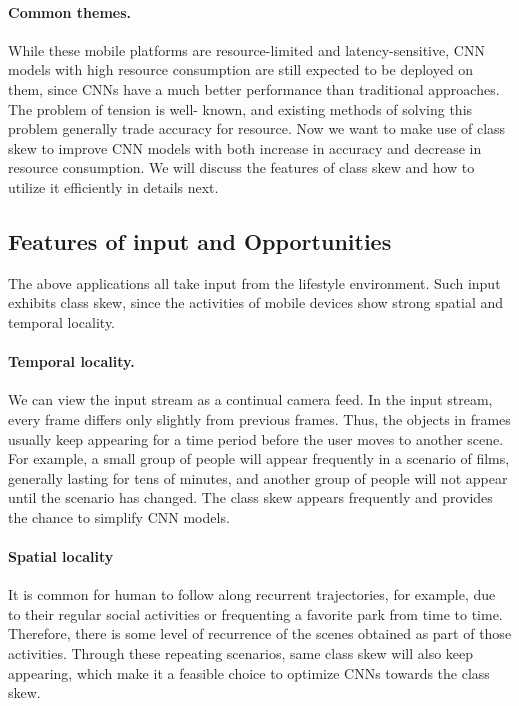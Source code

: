 \documentclass[pageno]{jpaper}
\begin{document}
\paragraph{Common themes.} While these mobile platforms are resource-limited and latency-sensitive, CNN models with high resource consumption are still expected to be deployed on them, since CNNs have a much better performance than traditional approaches. The problem of tension is well- known, and existing methods of solving this problem generally trade accuracy for resource. Now we want to make use of class skew to improve CNN models with both increase in accuracy and decrease in resource consumption. We will discuss the features of class skew and how to utilize it efficiently in details next.

\subsection{Features of input and Opportunities}
The above applications all take input from the lifestyle environment. Such input exhibits class skew, since the activities of mobile devices show strong spatial and temporal locality. 

\paragraph{Temporal locality.} We can view the input stream as a continual camera feed. In the input stream, every frame differs only slightly from previous frames. Thus, the objects in frames usually keep appearing for a time period before the user moves to another scene. For example, a small group of people will appear frequently in a scenario of films, generally lasting for tens of minutes, and another group of people will not appear until the scenario has changed. The class skew appears frequently and provides the chance to simplify CNN models. 

\paragraph{Spatial locality} It is common for human to follow along recurrent trajectories, for example, due to their regular social activities or frequenting a favorite park from time to time. Therefore, there is some level of recurrence of the scenes obtained as part of those activities. Through these repeating scenarios, same class skew will also keep appearing, which make it a feasible choice to optimize CNNs towards the class skew.
\end{document}
